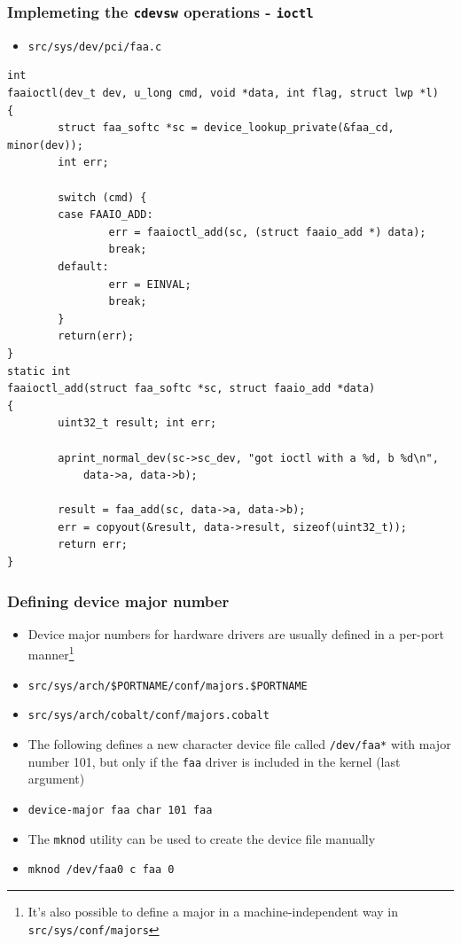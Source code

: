 \documentclass[dvipsnames,table]{beamer}
\begin{document}
\begin{frame}[fragile]
\frametitle{Implemeting the {\tt cdevsw} operations - {\tt ioctl}}
\begin{itemize}
	\item {\tt src/sys/dev/pci/faa.c}
\end{itemize}
\begin{lstlisting}
int
faaioctl(dev_t dev, u_long cmd, void *data, int flag, struct lwp *l)
{
        struct faa_softc *sc = device_lookup_private(&faa_cd, minor(dev));
        int err;

        switch (cmd) {
        case FAAIO_ADD:
                err = faaioctl_add(sc, (struct faaio_add *) data);
                break;
        default:
                err = EINVAL;
                break;
        }
        return(err);
}
static int
faaioctl_add(struct faa_softc *sc, struct faaio_add *data)
{
        uint32_t result; int err;

        aprint_normal_dev(sc->sc_dev, "got ioctl with a %d, b %d\n",
            data->a, data->b);

        result = faa_add(sc, data->a, data->b);
        err = copyout(&result, data->result, sizeof(uint32_t));
        return err;
}
\end{lstlisting}
\end{frame}

\begin{frame}
\frametitle{Defining device major number}
\begin{itemize}
	\item Device major numbers for hardware drivers are usually defined in a per-port manner\footnote{It's also possible to define a major in a machine-independent way in {\tt src/sys/conf/majors}}
	\item {\tt src/sys/arch/\$PORTNAME/conf/majors.\$PORTNAME}
	\item {\tt src/sys/arch/cobalt/conf/majors.cobalt}
	\item The following defines a new character device file called {\tt /dev/faa*} with major number 101, but only if the {\tt faa} driver is included in the kernel (last argument)
	\item {\tt device-major faa char 101 faa}
	\item The {\tt mknod} utility can be used to create the device file manually
	\item {\tt mknod /dev/faa0 c faa 0}

\end{itemize}
\end{frame}
\end{document}
